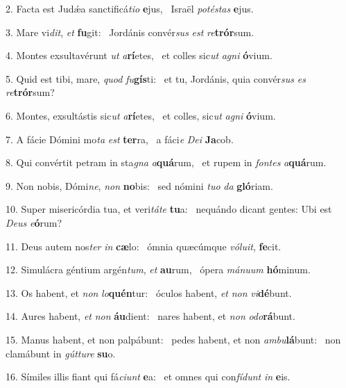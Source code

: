 2. Facta est Judǽa sanctificá\textit{ti}\textit{o} \textbf{e}jus, \ast\  Israël \textit{pot}\textit{és}\textit{tas} \textbf{e}jus.\

3. Mare vi\textit{dit}, \textit{et} \textbf{fu}git: \ast\  Jordánis convér\textit{sus} \textit{est} \textit{re}\textbf{trór}sum.\

4. Montes exsultavérunt \textit{ut} \textit{a}\textbf{rí}etes, \ast\  et colles sic\textit{ut} \textit{a}\textit{gni} \textbf{ó}vium.\

5. Quid est tibi, mare, \textit{quod} \textit{fu}\textbf{gís}ti: \ast\  et tu, Jordánis, quia convér\textit{sus} \textit{es} \textit{re}\textbf{trór}sum?\

6. Montes, exsultástis sic\textit{ut} \textit{a}\textbf{rí}etes, \ast\  et colles, sic\textit{ut} \textit{a}\textit{gni} \textbf{ó}vium.\

7. A fácie Dómini mo\textit{ta} \textit{est} \textbf{ter}ra, \ast\  a fáci\textit{e} \textit{De}\textit{i} \textbf{Ja}cob.\

8. Qui convértit petram in sta\textit{gna} \textit{a}\textbf{quá}rum, \ast\  et rupem in \textit{fon}\textit{tes} \textit{a}\textbf{quá}rum.\

9. Non nobis, Dómi\textit{ne}, \textit{non} \textbf{no}bis: \ast\  sed nómini \textit{tu}\textit{o} \textit{da} \textbf{gló}riam.\

10. Super misericórdia tua, et veri\textit{tá}\textit{te} \textbf{tu}a: \ast\  nequándo dicant gentes: Ubi est \textit{De}\textit{us} \textit{e}\textbf{ó}rum?\

11. Deus autem nos\textit{ter} \textit{in} \textbf{cæ}lo: \ast\  ómnia quæcúmque \textit{vó}\textit{lu}\textit{it}, \textbf{fe}cit.\

12. Simulácra géntium argén\textit{tum}, \textit{et} \textbf{au}rum, \ast\  ópera \textit{má}\textit{nu}\textit{um} \textbf{hó}minum.\

13. Os habent, et \textit{non} \textit{lo}\textbf{quén}tur: \ast\  óculos habent, \textit{et} \textit{non} \textit{vi}\textbf{dé}bunt.\

14. Aures habent, \textit{et} \textit{non} \textbf{áu}dient: \ast\  nares habent, et \textit{non} \textit{o}\textit{do}\textbf{rá}bunt.\

15. Manus habent, et non palpábunt: \dag\  pedes habent, et non \textit{am}\textit{bu}\textbf{lá}bunt: \ast\  non clamábunt in \textit{gút}\textit{tu}\textit{re} \textbf{su}o.\

16. Símiles illis fiant qui fá\textit{ci}\textit{unt} \textbf{e}a: \ast\  et omnes qui con\textit{fí}\textit{dunt} \textit{in} \textbf{e}is.\

